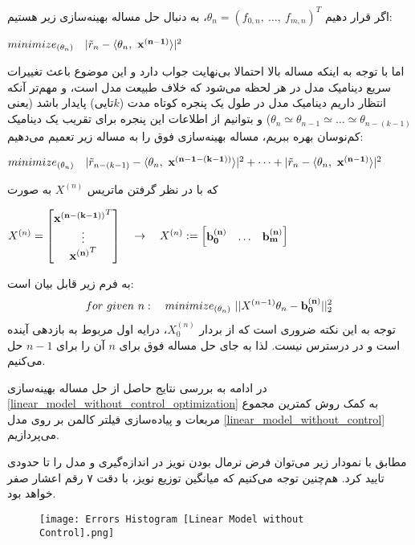 \documentclass{scribe-cgenomics}
\begin{document}
اگر قرار دهیم
$\theta_n = (f_{0,n},\ \dots,\ f_{m, n})^T$،
به دنبال حل مساله بهینه‌سازی زیر هستیم:
\begin{center}
$minimize_{(\theta_n)}\quad |\tilde{r}_n - \langle\theta_n,\ \bold{x^{(n-1)}}\rangle |^2$
\end{center}
اما با توجه به اینکه مساله بالا احتمالا بی‌نهایت جواب دارد و این موضوع باعث تغییرات سریع دینامیک مدل در هر لحظه می‌شود که خلاف طبیعت مدل است، و مهم‌تر آنکه انتظار داریم دینامیک مدل در طول یک پنجره کوتاه مدت
($k$تایی)
پایدار باشد (یعنی
$\theta_{n}\simeq \theta_{n-1} \simeq \dots \simeq \theta_{n-(k-1)}$) و بتوانیم از اطلاعات این پنجره برای تقریب یک دینامیک کم‌نوسان بهره ببریم، مساله بهینه‌سازی فوق را به مساله زیر تعمیم می‌دهیم:
\begin{center}
$minimize_{(\theta_n)} \quad |\tilde{r}_{n-(k-1)} - \langle\theta_{n},\ \bold{x^{(n-1-(k-1))}}\rangle |^2 + \dots + |\tilde{r}_n - \langle\theta_n,\ \bold{x^{(n-1)}}\rangle |^2$
\end{center}
که با در نظر گرفتن ماتریس
$X^{(n)}$
به صورت
\begin{center}
$
X^{(n)} = 
\begin{bmatrix}
\bold{x^{(n-(k-1))}}^T \\
\vdots \\
\bold{x^{(n)}}^T \\
\end{bmatrix}
\quad
\rightarrow
\quad
X^{(n)} :=
\begin{bmatrix}
\bold{b^{(n)}_0} & \dots & \bold{b^{(n)}_m}
\end{bmatrix}
$
\end{center}
به فرم زیر قابل بیان است:
\begin{equation}\label{linear_model_without_control_optimization}
for\ given\ n:\quad minimize_{(\theta_n)}\ ||X^{(n-1)}\theta_n - \bold{b^{(n)}_0}||_2^2
\end{equation}
توجه به این نکته ضروری است که از بردار
$X^{(n)}_0$،
درایه اول مربوط به بازدهی آینده است و در درسترس نیست. لذا به جای حل مساله فوق برای
$n$
آن را برای
$n-1$
حل می‌کنیم.

در ادامه به بررسی نتایج حاصل از حل مساله بهینه‌سازی
\ref{linear_model_without_control_optimization}
به کمک روش کمترین مجموع مربعات و پیاده‌سازی فیلتر کالمن بر روی مدل
\ref{linear_model_without_control}
می‌پردازیم.

\begin{مشاهده}
مطابق با نمودار زیر می‌توان فرض نرمال بودن نویز در اندازه‌گیری و مدل را تا حدودی تایید کرد. هم‌چنین توجه می‌کنیم که میانگین توزیع نویز، با دقت ۷ رقم اعشار صفر خواهد بود.

\begin{figure}
\texttt{[image: Errors Histogram [Linear Model without Control].png]}
\centering
\end{figure}
\end{مشاهده}
\end{document}
